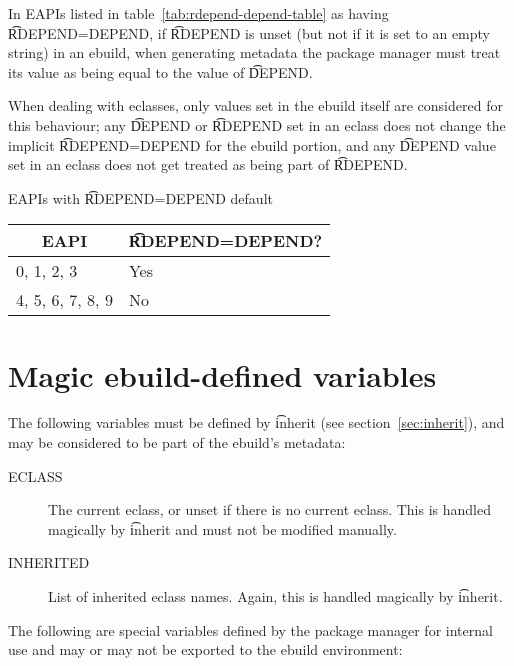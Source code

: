  In EAPIs listed in table~\ref{tab:rdepend-depend-table} as having
\t{RDEPEND=DEPEND}, if \t{RDEPEND} is unset (but not if it is set to an empty string) in an ebuild,
when generating metadata the package manager must treat its value as being equal to the value of
\t{DEPEND}.

When dealing with eclasses, only values set in the ebuild itself are considered for this behaviour;
any \t{DEPEND} or \t{RDEPEND} set in an eclass does not change the implicit \t{RDEPEND=DEPEND} for
the ebuild portion, and any \t{DEPEND} value set in an eclass does not get treated as being part of
\t{RDEPEND}.

\begin{centertable}{EAPIs with \t{RDEPEND=DEPEND} default}
    \label{tab:rdepend-depend-table}
    \begin{tabular}{ll}
      \toprule
      \multicolumn{1}{c}{\textbf{EAPI}} &
      \multicolumn{1}{c}{\textbf{\t{RDEPEND=DEPEND}?}} \\
      \midrule
      0, 1, 2, 3        & Yes \\
      4, 5, 6, 7, 8, 9  & No  \\
      \bottomrule
    \end{tabular}
\end{centertable}

\section{Magic ebuild-defined variables}

The following variables must be defined by \t{inherit} (see section~\ref{sec:inherit}), and may be
considered to be part of the ebuild's metadata:

\begin{description}
\item[ECLASS] The current eclass, or unset if there is no current eclass. This is handled magically
    by \t{inherit} and must not be modified manually.
\item[INHERITED] List of inherited eclass names. Again, this is handled magically by \t{inherit}.
\end{description}


The following are special variables defined by the package manager for internal use and may or may
not be exported to the ebuild environment:

